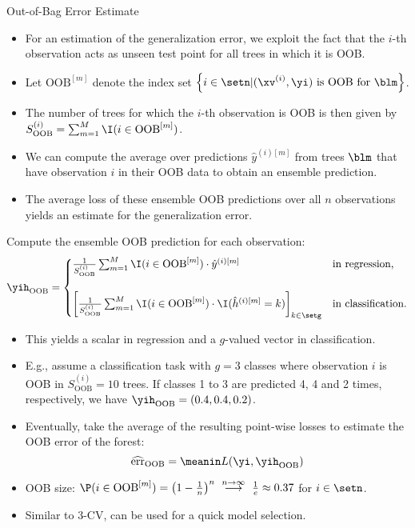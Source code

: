 \documentclass[11pt,compress,t,notes=noshow, xcolor=table]{beamer}
\begin{document}
\begin{vbframe}{Out-of-Bag Error Estimate}
\begin{itemize}
  \item For an estimation of the generalization error, we exploit the 
  fact that the $i$-th observation acts as unseen test point for all trees in 
  which it is OOB. 
  \item Let $\text{OOB}^{[m]}$ denote the index set 
  $\left \{i \in \setn | (\xv^{(i)}, \yi) \text{ is OOB for } \blm \right \}$.
  \item The number of trees for which the $i$-th observation is OOB is then 
  given by $S_{\text{OOB}}^{(i)} = 
  \sum_{m = 1}^M \I(i \in \text{OOB}^{[m]})$.
  \item We can compute the average over predictions $\hat{y}^{(i)[m]}$ from 
  trees $\blm$ that have observation $i$ in their OOB data to obtain an 
  ensemble prediction.
  \item The average loss of these ensemble OOB predictions over all $n$ 
  observations yields an estimate for the generalization error.
\end{itemize}
Compute the ensemble OOB prediction for each observation:
$$\yih_{\text{OOB}} = \begin{cases}
\frac{1}{S_{\text{OOB}}^{(i)}} \sum_{m = 1}^{M} 
\I(i \in \text{OOB}^{[m]}) \cdot \hat{y}^{(i)[m]}
& \text{in regression,} \\ 
\phantom{x} \\
\left[
\frac{1}{S_{\text{OOB}}^{(i)}} \sum_{m = 1}^{M} \I(i \in \text{OOB}^{[m]}) 
\cdot \I(\hat{h}^{(i)[m]} = k) \right]_{k \in \setg} &
\text{in classification.}
\end{cases}$$
\begin{itemize}
  \footnotesize
  \item This yields a scalar in regression and 
  a $g$-valued vector in classification.
  \item E.g., assume a classification task with $g = 3$ classes where 
  observation $i$ is OOB in $S_{\text{OOB}}^{(i)} = 10$ trees. If classes 1 to 
  3 are predicted 4, 4 and 2 times, respectively, we have 
  $\yih_{\text{OOB}} = (0.4, 0.4, 0.2)$.
  \item Eventually, take the average of the resulting point-wise losses to 
  estimate the OOB error of the forest:
  $$\widehat{\text{err}}_{\text{OOB}} = \meanin L(\yi, \yih_{\text{OOB}})$$
  \item OOB size: $\P(i \in \text{OOB}^{[m]}) = \left(1 - \frac{1}{n}\right)^n 
  \ \stackrel{n \to \infty}{\longrightarrow} \ \frac{1}{e} \approx 0.37$ for 
  $i \in \setn$.
  \item Similar to 3-CV, can be used for a quick model selection.
\end{itemize}


\end{vbframe}
\end{document}
